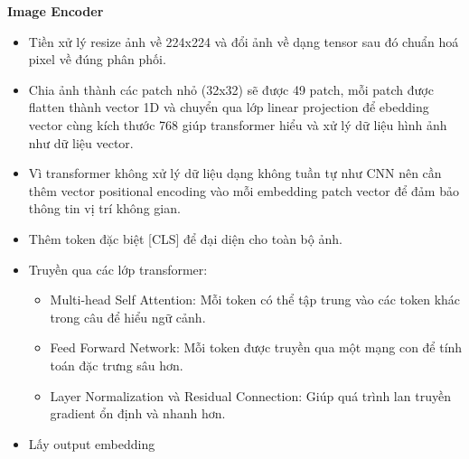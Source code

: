 \documentclass[../main.tex]{subfiles}
\begin{document}
\textbf{Image Encoder}
\begin{itemize}
        \item Tiền xử lý resize ảnh về 224x224 và đổi ảnh về dạng tensor sau đó chuẩn hoá pixel về đúng phân phối.
        \item Chia ảnh thành các patch nhỏ (32x32) sẽ được 49 patch, mỗi patch được flatten thành vector 1D và chuyển qua lớp linear projection để ebedding vector cùng kích thước 768 giúp transformer hiểu và xử lý dữ liệu hình ảnh như dữ liệu vector.
        \item Vì transformer không xử lý dữ liệu dạng không tuần tự như CNN nên cần thêm vector positional encoding vào mỗi embedding patch vector để đảm bảo thông tin vị trí không gian.
        \item Thêm token đặc biệt [CLS] để đại diện cho toàn bộ ảnh.
        \item Truyền qua các lớp transformer:
        \begin{itemize}
            \item Multi-head Self Attention: Mỗi token có thể tập trung vào các token khác trong câu để hiểu ngữ cảnh.
            \item Feed Forward Network: Mỗi token được truyền qua một mạng con để tính toán đặc trưng sâu hơn.
            \item Layer Normalization và Residual Connection: Giúp quá trình lan truyền gradient ổn định và nhanh hơn.
        \end{itemize}
        \item Lấy output embedding
    \end{itemize}
\end{document}
